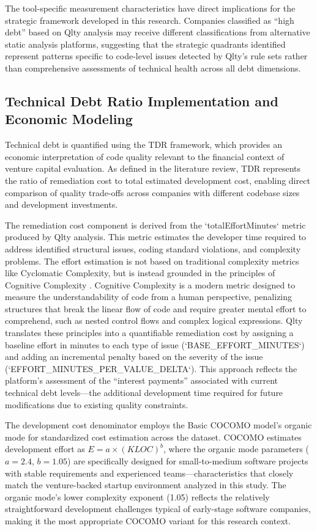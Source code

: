 The tool-specific measurement characteristics have direct implications for the strategic framework developed in this research. Companies classified as ``high debt'' based on Qlty analysis may receive different classifications from alternative static analysis platforms, suggesting that the strategic quadrants identified represent patterns specific to code-level issues detected by Qlty's rule sets rather than comprehensive assessments of technical health across all debt dimensions.

\subsection{Technical Debt Ratio Implementation and Economic Modeling}
Technical debt is quantified using the \ac{TDR} framework, which provides an economic interpretation of code quality relevant to the financial context of venture capital evaluation. As defined in the literature review, \ac{TDR} represents the ratio of remediation cost to total estimated development cost, enabling direct comparison of quality trade-offs across companies with different codebase sizes and development investments.

The remediation cost component is derived from the `totalEffortMinutes` metric produced by Qlty analysis. This metric estimates the developer time required to address identified structural issues, coding standard violations, and complexity problems. The effort estimation is not based on traditional complexity metrics like Cyclomatic Complexity, but is instead grounded in the principles of Cognitive Complexity \citep{Campbell2023CognitiveComplexity}. Cognitive Complexity is a modern metric designed to measure the understandability of code from a human perspective, penalizing structures that break the linear flow of code and require greater mental effort to comprehend, such as nested control flows and complex logical expressions. Qlty translates these principles into a quantifiable remediation cost by assigning a baseline effort in minutes to each type of issue (`BASE\_EFFORT\_MINUTES`) and adding an incremental penalty based on the severity of the issue (`EFFORT\_MINUTES\_PER\_VALUE\_DELTA`). This approach reflects the platform's assessment of the ``interest payments'' associated with current technical debt levels—the additional development time required for future modifications due to existing quality constraints.

The development cost denominator employs the Basic \ac{COCOMO} model's organic mode for standardized cost estimation across the dataset. \ac{COCOMO} estimates development effort as $E = a \times (KLOC)^b$, where the organic mode parameters ($a = 2.4$, $b = 1.05$) are specifically designed for small-to-medium software projects with stable requirements and experienced teams—characteristics that closely match the venture-backed startup environment analyzed in this study. The organic mode's lower complexity exponent (1.05) reflects the relatively straightforward development challenges typical of early-stage software companies, making it the most appropriate \ac{COCOMO} variant for this research context.

